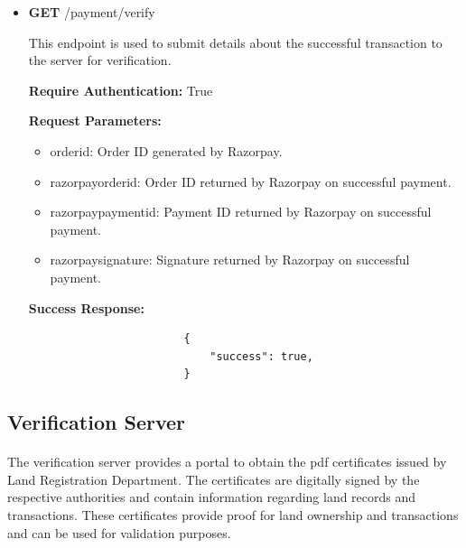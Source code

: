 \documentclass[12pt]{article}
\begin{document}
\begin{itemize}
            \item \textbf{GET}  /payment/verify
                \begin{addmargin}[1em]{2em}%
                    This endpoint is used to submit details about the successful transaction to the server for verification.
                    \par\textbf{Require Authentication:} True
                    \par\textbf{Request Parameters:}
                    \begin{itemize}
                        \item order\textunderscore id: Order ID generated by Razorpay.
                        \item razorpay\textunderscore order\textunderscore id: Order ID returned by Razorpay on successful payment.
                        \item razorpay\textunderscore payment\textunderscore id: Payment ID returned by Razorpay on successful payment.
                        \item razorpay\textunderscore signature: Signature returned by Razorpay on successful payment.
                    \end{itemize}
                    \par\textbf{Success Response:}
                    \begin{listing}[H]
                    \begin{verbatim}
                        {     
                            "success": true,
                        }
                    \end{verbatim}
                   \end{listing}
                \end{addmargin}
        
        \end{itemize}

    \subsection{Verification Server}
        \paragraph{}
        The verification server provides a portal to obtain the \acrshort{pdf} certificates issued by Land Registration Department. The certificates are digitally signed by the respective authorities and contain information regarding land records and transactions. These certificates provide proof for land ownership and transactions and can be used for validation purposes.
        
\end{document}
